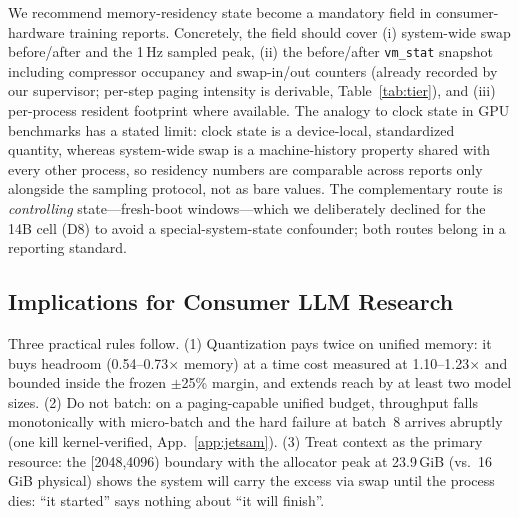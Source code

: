 \documentclass[10pt,twocolumn]{article}
\begin{document}
We recommend memory-residency state become a mandatory field in
consumer-hardware training reports. Concretely, the field should cover
(i) system-wide swap before/after and the 1\,Hz sampled peak, (ii) the
before/after \texttt{vm\_stat} snapshot including compressor occupancy
and swap-in/out counters (already recorded by our supervisor; per-step
paging intensity is derivable, Table~\ref{tab:tier}), and (iii)
per-process resident footprint where available. The analogy to clock
state in GPU benchmarks has a stated limit: clock state is a
device-local, standardized quantity, whereas system-wide swap is a
machine-history property shared with every other process, so residency
numbers are comparable across reports only alongside the sampling
protocol, not as bare values. The complementary route is
\emph{controlling} state---fresh-boot windows---which we deliberately
declined for the 14B cell (D8) to avoid a special-system-state
confounder; both routes belong in a reporting standard.

\subsection{Implications for Consumer LLM Research}
Three practical rules follow. (1) Quantization pays twice on unified
memory: it buys headroom (0.54--0.73$\times$ memory) at a time cost
measured at 1.10--1.23$\times$ and bounded inside the frozen $\pm$25\%
margin, and extends reach by at least two model sizes. (2) Do not
batch: on a paging-capable unified budget, throughput falls
monotonically with micro-batch and the hard failure at batch~8 arrives
abruptly (one kill kernel-verified, App.~\ref{app:jetsam}). (3) Treat
context as the primary resource: the [2048,4096) boundary with the
allocator peak at 23.9\,GiB (vs.\ 16\,GiB physical) shows the system
will carry the excess via swap until the process dies: ``it started''
says nothing about ``it will finish''.
\end{document}
